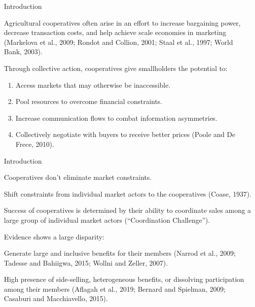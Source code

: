 \documentclass[aspectratio=169]{beamer}
\newenvironment{wideitemize}{\itemize\addtolength{\itemsep}{10pt}}{\enditemize}
\begin{document}
\begin{frame}{Introduction}
    \begin{wideitemize}
        \item Agricultural cooperatives often arise in an effort to increase bargaining power, decrease transaction costs, and help achieve scale economies in marketing (Markelova et al., 2009; Rondot and Collion, 2001; Staal et al., 1997; World Bank, 2003).
        \item Through collective action, cooperatives give smallholders the potential to: \vspace{.25cm}
            \begin{enumerate}
                \item Access markets that may otherwise be inaccessible. \vspace{.25cm}
                \item Pool resources to overcome financial constraints. \vspace{.25cm}
                \item Increase communication flows to combat information asymmetries. \vspace{.25cm}
                \item Collectively negotiate with buyers to receive better prices (Poole and De Frece, 2010).
            \end{enumerate}
    \end{wideitemize}
\end{frame}

\begin{frame}{Introduction}
    \begin{wideitemize}
        \item Cooperatives don't eliminate market constraints. \vspace{.25cm}
            \begin{wideitemize}
                \item Shift constraints from individual market actors to the cooperatives (Coase, 1937). 
            \end{wideitemize}
        \item Success of cooperatives is determined by their ability to coordinate sales among a large group of individual market actors (``Coordination Challenge''). 
        \item Evidence shows a large disparity: \vspace{.25cm}
            \begin{wideitemize}
                \item Generate large and inclusive benefits for their members (Narrod et al., 2009; Tadesse and Bahiigwa, 2015; Wollni and Zeller, 2007). 
                \item High presence of side-selling, heterogeneous benefits, or dissolving participation among their members (Aflagah et al., 2019; Bernard and Spielman, 2009; Casaburi and Macchiavello, 2015).
            \end{wideitemize}
    \end{wideitemize}
\end{frame}
\end{document}
